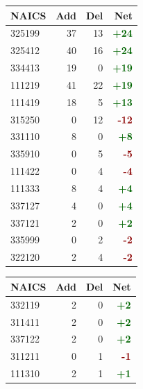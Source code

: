 \documentclass[11pt]{article}
\begin{document}
\begin{table}[H]
\centering
\begin{minipage}{0.48\textwidth}
\centering
{}
\begin{tabular}{lrrr}
\toprule
\textbf{NAICS} & \textbf{Add} & \textbf{Del} & \textbf{Net} \\
\midrule
325199 & 37 & 13 & \textcolor{darkgreen}{\textbf{+24}} \\
325412 & 40 & 16 & \textcolor{darkgreen}{\textbf{+24}} \\
334413 & 19 & 0 & \textcolor{darkgreen}{\textbf{+19}} \\
111219 & 41 & 22 & \textcolor{darkgreen}{\textbf{+19}} \\
111419 & 18 & 5 & \textcolor{darkgreen}{\textbf{+13}} \\
315250 & 0 & 12 & \textcolor{darkred}{\textbf{-12}} \\
331110 & 8 & 0 & \textcolor{darkgreen}{\textbf{+8}} \\
335910 & 0 & 5 & \textcolor{darkred}{\textbf{-5}} \\
111422 & 0 & 4 & \textcolor{darkred}{\textbf{-4}} \\
111333 & 8 & 4 & \textcolor{darkgreen}{\textbf{+4}} \\
337127 & 4 & 0 & \textcolor{darkgreen}{\textbf{+4}} \\
337121 & 2 & 0 & \textcolor{darkgreen}{\textbf{+2}} \\
335999 & 0 & 2 & \textcolor{darkred}{\textbf{-2}} \\
322120 & 2 & 4 & \textcolor{darkred}{\textbf{-2}} \\
\bottomrule
\end{tabular}
\end{minipage}
\hfill
\begin{minipage}{0.48\textwidth}
\centering
{}
\begin{tabular}{lrrr}
\toprule
\textbf{NAICS} & \textbf{Add} & \textbf{Del} & \textbf{Net} \\
\midrule
332119 & 2 & 0 & \textcolor{darkgreen}{\textbf{+2}} \\
311411 & 2 & 0 & \textcolor{darkgreen}{\textbf{+2}} \\
337122 & 2 & 0 & \textcolor{darkgreen}{\textbf{+2}} \\
311211 & 0 & 1 & \textcolor{darkred}{\textbf{-1}} \\
111310 & 2 & 1 & \textcolor{darkgreen}{\textbf{+1}} \\

\end{tabular}
\end{minipage}
\end{table}
\end{document}
